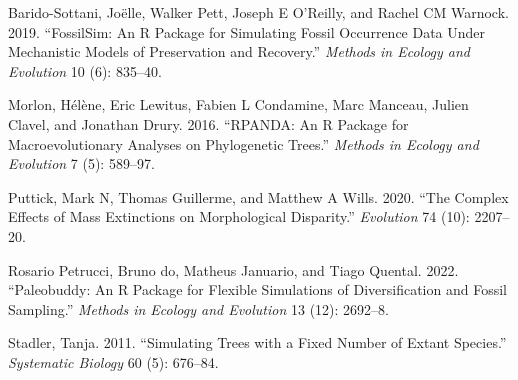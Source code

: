 \documentclass[
]{article}
\newlength{\cslhangindent}
\newenvironment{cslreferences}%
  {\setlength{\parindent}{0pt}%
  \everypar{\setlength{\hangindent}{\cslhangindent}}\ignorespaces}%
  {\par}
\begin{document}
\hypertarget{refs}{}
\begin{cslreferences}
\leavevmode\hypertarget{ref-fossilsim}{}%
Barido-Sottani, Joëlle, Walker Pett, Joseph E O'Reilly, and Rachel CM
Warnock. 2019. ``FossilSim: An R Package for Simulating Fossil
Occurrence Data Under Mechanistic Models of Preservation and Recovery.''
\emph{Methods in Ecology and Evolution} 10 (6): 835--40.

\leavevmode\hypertarget{ref-rpanda}{}%
Morlon, Hélène, Eric Lewitus, Fabien L Condamine, Marc Manceau, Julien
Clavel, and Jonathan Drury. 2016. ``RPANDA: An R Package for
Macroevolutionary Analyses on Phylogenetic Trees.'' \emph{Methods in
Ecology and Evolution} 7 (5): 589--97.

\leavevmode\hypertarget{ref-puttick2020complex}{}%
Puttick, Mark N, Thomas Guillerme, and Matthew A Wills. 2020. ``The
Complex Effects of Mass Extinctions on Morphological Disparity.''
\emph{Evolution} 74 (10): 2207--20.

\leavevmode\hypertarget{ref-paleobuddy}{}%
Rosario Petrucci, Bruno do, Matheus Januario, and Tiago Quental. 2022.
``Paleobuddy: An R Package for Flexible Simulations of Diversification
and Fossil Sampling.'' \emph{Methods in Ecology and Evolution} 13 (12):
2692--8.

\leavevmode\hypertarget{ref-treesim}{}%
Stadler, Tanja. 2011. ``Simulating Trees with a Fixed Number of Extant
Species.'' \emph{Systematic Biology} 60 (5): 676--84.
\end{cslreferences}
\end{document}
